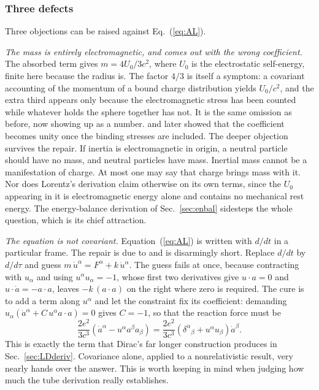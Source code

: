 \documentclass[preprint]{aastex701}
\begin{document}
\subsubsection{Three defects}
\label{sec:defects}

Three objections can be raised against Eq.~(\ref{eq:AL}).

\emph{The mass is entirely electromagnetic, and comes out with the wrong
coefficient.} The absorbed term gives $m = 4U_0/3c^2$, where $U_0$ is the
electrostatic self-energy, finite here because the radius is. The factor $4/3$
is itself a symptom: a covariant accounting of the momentum of a bound charge
distribution yields $U_0/c^2$, and the extra third appears only because the
electromagnetic stress has been counted while whatever holds the sphere together
has not. It is the same omission as before, now showing up as a number.
\citet{fermi1922} and \citet{wilson1936} later showed that the coefficient becomes unity once the binding stresses
are included. The deeper objection survives the repair. If inertia is
electromagnetic in origin, a neutral particle should have no mass, and neutral
particles have mass. Inertial mass cannot be a manifestation of charge. At most
one may say that charge brings mass with it. Nor does Lorentz's derivation claim
otherwise on its own terms, since the $U_0$ appearing in it is electromagnetic
energy alone and contains no mechanical rest energy. The energy-balance
derivation of Sec.~\ref{sec:enbal} sidesteps the whole question, which is its
chief attraction.

\emph{The equation is not covariant.} Equation~(\ref{eq:AL}) is written with
$d/dt$ in a particular frame. The repair is due to \citet{landau_lifshitz} and is
disarmingly short. Replace $d/dt$ by $d/d\tau$ and guess
$m\,\dot u^\alpha = F^\alpha + k\,\ddot u^\alpha$. The guess fails at once,
because contracting with $u_\alpha$ and using $u^\alpha u_\alpha = -1$, whose
first two derivatives give $u\cdot a = 0$ and $u\cdot\dot a = -a\cdot a$, leaves
$-k\,(a\cdot a)$ on the right where zero is required. The cure is to add a term
along $u^\alpha$ and let the constraint fix its coefficient: demanding
$u_\alpha(\dot a^\alpha + C\,u^\alpha a\cdot a) = 0$ gives $C = -1$, so that the
reaction force must be
\begin{equation}
\frac{2e^2}{3c^3}\left(\dot a^\alpha - u^\alpha a^\beta a_\beta\right)
= \frac{2e^2}{3c^3}
\left(\delta^\alpha{}_\beta + u^\alpha u_\beta\right)\dot a^\beta .
\label{eq:LLcov}
\end{equation}
This is exactly the term that Dirac's far longer construction produces in
Sec.~\ref{sec:LDderiv}. Covariance alone, applied to a nonrelativistic result,
very nearly hands over the answer. This is worth keeping in mind when
judging how much the tube derivation really establishes.
\end{document}
